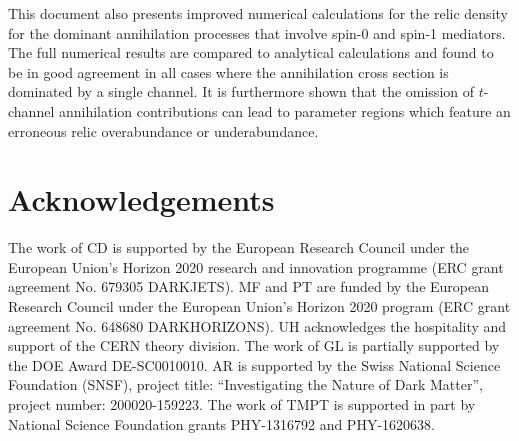 \documentclass[review]{elsarticle}
\begin{document}
This document also presents improved numerical calculations for the relic density for the dominant annihilation processes  that  involve  spin-0  and  spin-1  mediators. The full numerical results are compared to analytical calculations and found to be in good agreement in all cases  where the annihilation cross section is dominated by a single channel. It is furthermore shown that the omission of $t$-channel annihilation contributions can lead to parameter regions which feature an  erroneous  relic overabundance or  underabundance. 

\section{Acknowledgements} 
The work of CD is supported by the European Research Council under the European Union's Horizon 2020 research and innovation programme (ERC grant agreement No. 679305 DARKJETS).  MF and PT are funded by the European Research Council under the European Union's Horizon 2020 program (ERC grant agreement No. 648680 DARKHORIZONS). UH acknowledges the hospitality and support of the CERN theory division. The work of GL is partially supported by the DOE Award DE-SC0010010. AR is supported by the Swiss National Science Foundation (SNSF), project title: ``Investigating the Nature of Dark Matter'', project number: 200020-159223. The work of TMPT is supported in part by National Science Foundation grants PHY-1316792 and PHY-1620638. 



\end{document}
